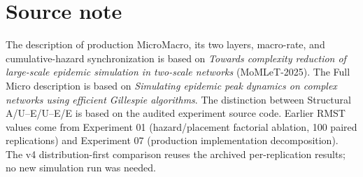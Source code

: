 \documentclass[11pt,a4paper]{article}
\begin{document}
\section*{Source note}
The description of production MicroMacro, its two layers, macro-rate, and cumulative-hazard synchronization is based on \emph{Towards complexity reduction of large-scale epidemic simulation in two-scale networks} (MoMLeT-2025). The Full Micro description is based on \emph{Simulating epidemic peak dynamics on complex networks using efficient Gillespie algorithms}. The distinction between Structural A/U--E/U--E/E is based on the audited experiment source code. Earlier RMST values come from Experiment 01 (hazard/placement factorial ablation, 100 paired replications) and Experiment 07 (production implementation decomposition). The v4 distribution-first comparison reuses the archived per-replication results; no new simulation run was needed.
\end{document}
